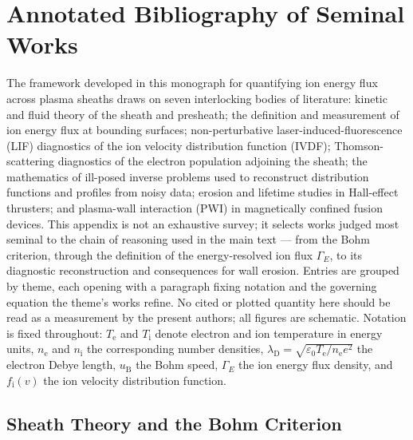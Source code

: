 \chapter{Annotated Bibliography of Seminal Works}
\label{app:annot}

The framework developed in this monograph for quantifying ion energy flux across plasma sheaths draws on seven interlocking bodies of literature: kinetic and fluid theory of the sheath and presheath; the definition and measurement of ion energy flux at bounding surfaces; non-perturbative laser-induced-fluorescence (LIF) diagnostics of the ion velocity distribution function (IVDF); Thomson-scattering diagnostics of the electron population adjoining the sheath; the mathematics of ill-posed inverse problems used to reconstruct distribution functions and profiles from noisy data; erosion and lifetime studies in Hall-effect thrusters; and plasma-wall interaction (PWI) in magnetically confined fusion devices. This appendix is not an exhaustive survey; it selects works judged most seminal to the chain of reasoning used in the main text --- from the Bohm criterion, through the definition of the energy-resolved ion flux $\Gamma_{E}$, to its diagnostic reconstruction and consequences for wall erosion. Entries are grouped by theme, each opening with a paragraph fixing notation and the governing equation the theme's works refine. No cited or plotted quantity here should be read as a measurement by the present authors; all figures are schematic. Notation is fixed throughout: $T_{\mathrm{e}}$ and $T_{\mathrm{i}}$ denote electron and ion temperature in energy units, $n_{\mathrm{e}}$ and $n_{\mathrm{i}}$ the corresponding number densities, $\lambda_{\mathrm{D}} = \sqrt{\varepsilon_{0} T_{\mathrm{e}}/n_{\mathrm{e}} e^{2}}$ the electron Debye length, $u_{\mathrm{B}}$ the Bohm speed, $\Gamma_{E}$ the ion energy flux density, and $f_{\mathrm{i}}(v)$ the ion velocity distribution function.

\section{Sheath Theory and the Bohm Criterion}
\label{app:annot:sheath-theory}

